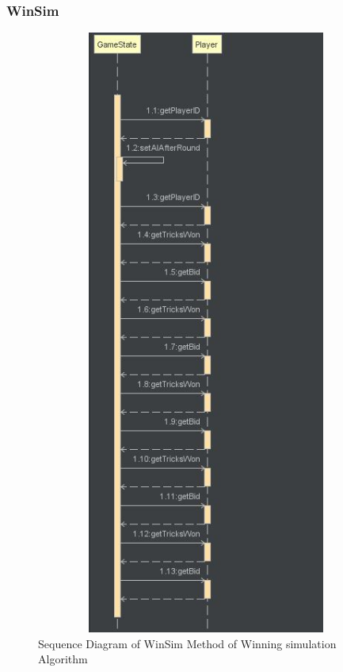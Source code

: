 \subsubsection{WinSim}
\begin{figure}
\centering
\label{fig:WinSim}
\includegraphics[width=15cm ,height=20cm,keepaspectratio]{WinSimSequenceDiagram}
\caption{Sequence Diagram of WinSim Method of Winning simulation Algorithm }
\end{figure}
